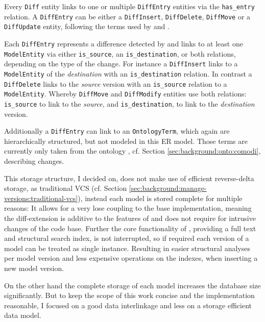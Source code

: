 Every \texttt{Diff} entity links to one or multiple \texttt{DiffEntry} entities via the \texttt{has\_entry} relation.  
A \texttt{DiffEntry} can be either a \texttt{DiffInsert},  \texttt{DiffDelete}, \texttt{DiffMove} or a \texttt{DiffUpdate} entity, following the terms used by \bives \citep{Scharm2015} and \comodi \citep{Scharm2016}.

Each \texttt{DiffEntry} represents a difference detected by \bives \citep{Scharm2015} and links to at least one \texttt{ModelEntity} via either \texttt{is\_source}, an \texttt{is\_destination}, or both relations, depending on the type of the change.
For instance a \texttt{DiffInsert} links to a \texttt{ModelEntity} of the \emph{destination} with an \texttt{is\_destination} relation.
In contrast a \texttt{DiffDelete} links to the \emph{source} version with an \texttt{is\_source} relation to a \texttt{ModelEntity}. Whereby \texttt{DiffMove} and \texttt{DiffModify} entities use both relations: \texttt{is\_source} to link to the \emph{source}, and \texttt{is\_destination}, to link to the \emph{destination} version.

Additionally a \texttt{DiffEntry} can link to an \texttt{OntologyTerm}, which again are hierarchically structured, but not modeled in this ER model. Those terms are currently only taken from the \comodi ontology \citep{Scharm2016}, cf. Section \ref{sec:background:onto:comodi}, describing changes.


This storage structure, I decided on, does not make use of efficient reverse-delta storage, as traditional VCS (cf. Section \ref{sec:background:manage-versions:traditional-vcs}), instead each model is stored complete for multiple reasons: It allows for a very lose coupling to the base \masymos implementation, meaning the diff-extension is additive to the features of \masymos and does not require for intrusive changes of the code base. Further the core functionality of \masymos, providing a full text and structural search index, is not interrupted, so if required each version of a model can be treated as single instance. Resulting in easier structural analyses per model version and less expensive operations on the indexes, when inserting a new model version.

On the other hand the complete storage of each model increases the database size significantly. But to keep the scope of this work concise and the implementation reasonable, I focused on a good data interlinkage and less on a storage efficient data model. 

